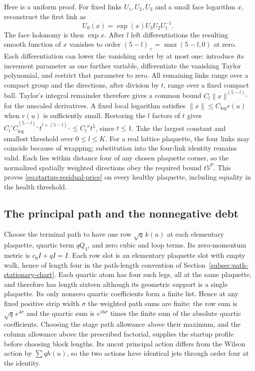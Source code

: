 Here is a uniform proof. For fixed links $U_1,U_2,U_3$ and a small
face logarithm $x$, reconstruct the first link as
\[
             U_0(x)=\exp(x)U_3U_2U_1^{-1}.
\]
The face holonomy is then $\exp x$. After $l$ left differentiations
the resulting smooth function of $x$ vanishes to order
$(5-l)_+=\max(5-l,0)$ at zero. Each differentiation can lower the
vanishing order by at most one: introduce its increment parameter
as one further variable, differentiate the vanishing Taylor
polynomial, and restrict that parameter to zero. All remaining
links range over a compact group and the directions, after division
by $t$, range over a fixed compact ball. Taylor's integral remainder
therefore gives a common bound $C_l\|x\|^{(5-l)_+}$ for the
unscaled derivatives. A fixed local logarithm satisfies
$\|x\|\le C_{\log}r(u)$ when $r(u)$ is sufficiently small.
Restoring the $l$ factors of $t$ gives
$C_l'C_{\log}^{(5-l)_+}t^{l+(5-l)_+}\le C_l''t^5$,
since $t\le1$. Take the largest constant and smallest threshold
over $0\le l\le K$. For a real lattice plaquette, the four links
may coincide because of wrapping; substitution into the four-link
identity remains valid. Each lies within distance four of any
chosen plaquette corner, so the normalized spatially weighted
directions obey the required bound $t5^P$. This proves
\eqref{eq:startup-residual-price} on every healthy plaquette,
including equality in the health threshold.

\subsection{The principal path and the nonnegative debt}
Choose the terminal path to have one row
$\sqrt q\,k(u)$ at each elementary plaquette, quartic term $qQ_4$,
and zero cubic and loop terms. Its zero-momentum metric is
$c_0I+qI=I$. Each row slot is an elementary plaquette slot with empty
walk, hence of length four in the path-length convention of
Section~\ref{subsec:path-stationary-chart}. Each quartic atom has four
such legs, all at the same plaquette, and therefore has length
sixteen although its geometric support is a single plaquette. Its only
nonzero quartic coefficients form a finite list. Hence at any fixed
positive strip width $\sigma$ the weighted path sums are finite: the
row sum is $\sqrt q\,e^{4\sigma}$ and the quartic sum is $e^{16\sigma}$
times the finite sum of the absolute quartic coefficients. Choosing
the stage path allowance above their maximum, and the column
allowance above the prescribed factorial, supplies the startup
profile before choosing block lengths. Its uncut principal action
differs from the Wilson action by $\sum qh(u)$, so the two actions
have identical jets through order four at the identity.

